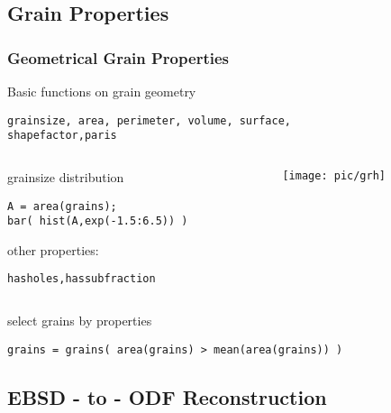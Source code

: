 \documentclass[compress]{beamer}
\begin{document}
%

\subsection*{Grain Properties}



\begin{frame}[fragile]
  \frametitle{Geometrical Grain Properties}

Basic functions on grain geometry
\begin{lstlisting}
grainsize, area, perimeter, volume, surface,
shapefactor,paris
\end{lstlisting}

\begin{columns}[t]
  \begin{column}[T]{6.5cm}

\medskip

  grainsize distribution
\begin{lstlisting}
A = area(grains);
bar( hist(A,exp(-1.5:6.5)) )
\end{lstlisting}

\medskip

other properties:
\begin{lstlisting}[basicstyle=\footnotesize]
hasholes,hassubfraction
\end{lstlisting}

	\end{column}
	\begin{column}[T]{5cm}
		\texttt{[image: pic/grh]}
	\end{column}
\end{columns}

select grains by properties
\begin{lstlisting}
grains = grains( area(grains) > mean(area(grains)) )
\end{lstlisting}

\end{frame}


%



\subsection*{EBSD - to - ODF Reconstruction}
\end{document}
